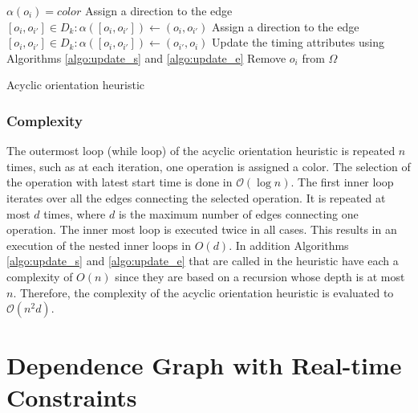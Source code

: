 \begin{algorithm}[htb]
{{{								%
			}
			$\alpha(o_i)=color$\;
			{
				{
					Assign a direction to the edge $[o_i,o_{i'}] \in D_k: \alpha([o_i,o_{i'}])\leftarrow (o_i,o_{i'})$
				}
				\Else
				{
					Assign a direction to the edge $[o_i,o_{i'}] \in D_k: \alpha([o_i,o_{i'}])\leftarrow (o_{i'},o_i)$
				}
			}
			Update the timing attributes using Algorithms \ref{algo:update_s} and \ref{algo:update_e}\;
			Remove $o_i$ from $\Omega$\;
		}
	}
	
 
	\caption{Acyclic orientation heuristic}
	\label{algo:ao}
\end{algorithm}

\subsubsection{Complexity}

The outermost loop (while loop) of the acyclic orientation heuristic is repeated $n$ times, such as at each iteration, one operation is assigned a color. The selection of the operation with latest start time is done in $\mathcal{O}(\log{}n)$. The first inner loop iterates over all the edges connecting the selected operation. It is repeated at most $d$ times, where $d$ is the maximum number of edges connecting one operation. The inner most loop is executed twice in all cases. This results in an execution of the nested inner loops in $O(d)$. In addition Algorithms \ref{algo:update_s} and \ref{algo:update_e} that are called in the heuristic have each a complexity of $O(n)$ since they are based on a recursion whose depth is at most $n$. Therefore, the complexity of the acyclic orientation heuristic is evaluated to $\mathcal{O}(n^2d)$.  


%
%

\section{Dependence Graph with Real-time Constraints}




